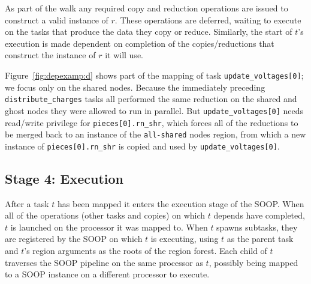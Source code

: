 As part of the walk any required copy and reduction operations are
issued to construct a valid instance of $r$.  These operations are
deferred, waiting to execute on the tasks that produce the data they
copy or reduce. Similarly, the start of $t$'s execution is made
dependent on completion of the copies/reductions that construct the
instance of $r$ it will use.

Figure~\ref{fig:depexamp:d} shows part of the mapping of task {\tt update\_voltages[0]}; we focus
only on the shared nodes.
Because the immediately preceding {\tt distribute\_charges} tasks all performed the same reduction
on the shared and ghost nodes they were allowed to run in parallel.  But {\tt update\_voltages[0]}
needs read/write privilege for {\tt pieces[0].rn\_shr}, which forces all of the reductions to be merged
back to an instance of the {\tt all-shared} nodes region, from which a new instance of {\tt pieces[0].rn\_shr} is copied and used by {\tt update\_voltages[0]}.

%
%
%

\subsection{Stage 4: Execution}
\label{sec:exec}

After a task $t$ has been mapped it enters the execution stage of the SOOP.  When all of
the operations (other tasks and copies) on which $t$ depends have completed, $t$ is
launched on the processor it was mapped to.  When $t$ spawns subtasks, 
they are registered by the SOOP on which $t$ is executing, using $t$ as the parent task 
and $t$'s region arguments as the roots of the region forest.  Each child of $t$ traverses
the SOOP pipeline on the same processor as $t$, possibly being mapped to a 
SOOP instance on a different processor to execute.   



